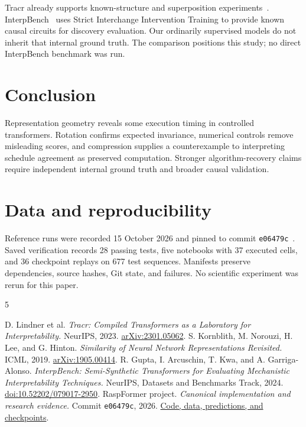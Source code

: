 \documentclass[10pt,a4paper,twocolumn]{article}
\begin{document}
Tracr already supports known-structure and superposition experiments~\cite{tracr}. InterpBench~\cite{interpbench} uses Strict Interchange Intervention Training to provide known causal circuits for discovery evaluation. Our ordinarily supervised models do not inherit that internal ground truth. The comparison positions this study; no direct InterpBench benchmark was run.

\section{Conclusion}
Representation geometry reveals some execution timing in controlled transformers. Rotation confirms expected invariance, numerical controls remove misleading scores, and compression supplies a counterexample to interpreting schedule agreement as preserved computation. Stronger algorithm-recovery claims require independent internal ground truth and broader causal validation.

\section*{Data and reproducibility}
Reference runs were recorded 15 October 2026 and pinned to commit \texttt{e06479c}~\cite{artifact}. Saved verification records 28 passing tests, five notebooks with 37 executed cells, and 36 checkpoint replays on 677 test sequences. Manifests preserve dependencies, source hashes, Git state, and failures. No scientific experiment was rerun for this paper.

\begin{thebibliography}{5}
\small\raggedright
{} D. Lindner et al. \emph{Tracr: Compiled Transformers as a Laboratory for Interpretability.} NeurIPS, 2023. \href{https://arxiv.org/abs/2301.05062}{arXiv:2301.05062}.
 S. Kornblith, M. Norouzi, H. Lee, and G. Hinton. \emph{Similarity of Neural Network Representations Revisited.} ICML, 2019. \href{https://arxiv.org/abs/1905.00414}{arXiv:1905.00414}.
 R. Gupta, I. Arcuschin, T. Kwa, and A. Garriga-Alonso. \emph{InterpBench: Semi-Synthetic Transformers for Evaluating Mechanistic Interpretability Techniques.} NeurIPS, Datasets and Benchmarks Track, 2024. \href{https://doi.org/10.52202/079017-2950}{doi:10.52202/079017-2950}.
 RaspFormer project. \emph{Canonical implementation and research evidence.} Commit \texttt{e06479c}, 2026. \href{https://github.com/raghulchandramouli/RaspFormer/tree/e06479ce09f10695aa5280162f80d880c060eaf5}{Code, data, predictions, and checkpoints}.
\end{thebibliography}
\end{document}
